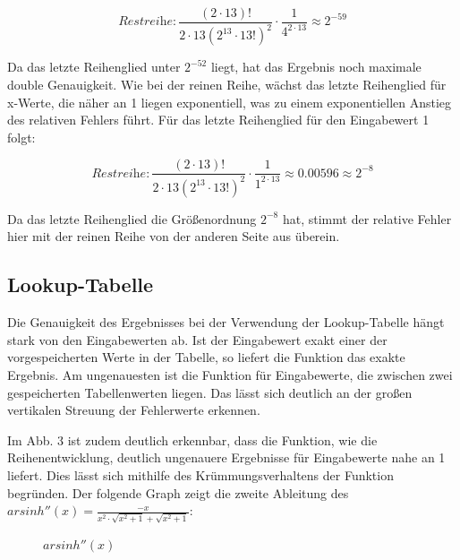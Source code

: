 \documentclass[course=erap] {aspdoc}
\begin{document}
    \[
        \textit{Restreihe}: \frac{(2\cdot13)!}{2\cdot13(2^{13}\cdot 13!)^2} \cdot \frac{1}{4^{2\cdot13}} \approx 2^{-59}
    \]

    Da das letzte Reihenglied unter $2^{-52}$ liegt, hat das Ergebnis noch maximale double Genauigkeit.
    Wie bei der reinen Reihe, wächst das letzte Reihenglied für x-Werte, die näher an 1 liegen exponentiell, was zu einem exponentiellen Anstieg des relativen Fehlers führt.
    Für das letzte Reihenglied für den Eingabewert 1 folgt:

    \[
        \textit{Restreihe}: \frac{(2\cdot13)!}{2\cdot13(2^{13}\cdot 13!)^2} \cdot \frac{1}{1^{2\cdot13}} \approx 0.00596 \approx 2^{-8}
    \]

    Da das letzte Reihenglied die Größenordnung $2^{-8}$ hat, stimmt der relative Fehler hier mit der reinen Reihe von der anderen Seite aus überein.

    \subsection{Lookup-Tabelle}\label{subsec:lookup-tabelle}

    Die Genauigkeit des Ergebnisses bei der Verwendung der Lookup-Tabelle hängt stark von den Eingabewerten ab.
    Ist der Eingabewert exakt einer der vorgespeicherten Werte in der Tabelle, so liefert die Funktion das exakte Ergebnis.
    Am ungenauesten ist die Funktion für Eingabewerte, die zwischen zwei gespeicherten Tabellenwerten liegen.
    Das lässt sich deutlich an der großen vertikalen Streuung der Fehlerwerte erkennen.

    Im Abb. 3 ist zudem deutlich erkennbar, dass die Funktion, wie die Reihenentwicklung, deutlich ungenauere Ergebnisse für Eingabewerte nahe an 1 liefert.
    Dies lässt sich mithilfe des Krümmungsverhaltens der Funktion begründen.
    Der folgende Graph zeigt die zweite Ableitung des $arsinh''(x) = \frac{-x}{x^2\cdot \sqrt{x^2+1}+\sqrt{x^2+1}}$:
    
    \begin{figure}
        \caption{$arsinh''(x)$}
    \end{figure}
\end{document}
